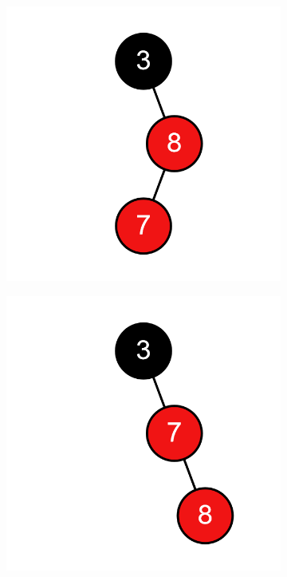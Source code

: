 \documentclass[11pt,a4paper]{article}
\begin{document}
\begin{loesung}
\begin{enumerate}[label=\alph*)]
\begin{enumerate}[label=\roman*)]
\begin{figure}[h!]
\begin{subfigure}[t]{0.15\textwidth}
                    \includegraphics[width=\textwidth]{img/2b/10}
                \end{subfigure}
                \begin{subfigure}[t]{0.15\textwidth}
                    \centering
                    \includegraphics[width=\textwidth]{img/2b/11}

\end{subfigure}
\end{figure}
\end{enumerate}
\end{enumerate}
\end{loesung}
\end{document}
